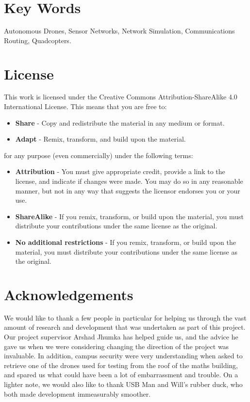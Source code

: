 \section{Key Words}
Autonomous Drones, Sensor Networks, Network Simulation, Communications Routing, Quadcopters.

\section{License}
This work is licensed under the Creative Commons Attribution-ShareAlike 4.0 International License. This means that you are free to:

\begin{itemize}
	\item \textbf{Share} - Copy and redistribute the material in any medium or format.
	\item \textbf{Adapt} - Remix, transform, and build upon the material.
\end{itemize}

for any purpose (even commercially) under the following terms: 

\begin{itemize}
	\item \textbf{Attribution} -  You must give appropriate credit, provide a link to the license, and indicate if changes were made. You may do so in any reasonable manner, but not in any way that suggests the licensor endorses you or your use.
	\item \textbf{ShareAlike} - If you remix, transform, or build upon the material, you must distribute your contributions under the same license as the original.
	\item \textbf{No additional restrictions} - If you remix, transform, or build upon the material, you must distribute your contributions under the same license as the original.
\end{itemize}

\begin{figure}[H]
	\centering
	\doclicenseImage
\end{figure}

\section{Acknowledgements}
We would like to thank a few people in particular for helping us through the vast amount of research and development that was undertaken as part of this project. Our project supervisor Arshad Jhumka has helped guide us, and the advice he gave us when we were considering changing the direction of the project was invaluable. In addition, campus security were very understanding when asked to retrieve one of the drones used for testing from the roof of the maths building, and spared us what could have been a lot of embarrassment and trouble. On a lighter note, we would also like to thank USB Man and Will's rubber duck, who both made development immeasurably smoother.

